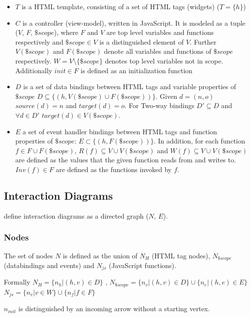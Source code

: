 \begin{itemize}
  \item $T$ is a HTML template, consisting of a set of HTML tags (widgets) ($T = \{h\}$)
  \item 
  $C$ is a controller (view-model), written in JavaScript. It is modeled as a tuple ($V$, $F$, $\$scope$), where $F$ and $V$ are top level variables and functions respectively and $\$scope \in V$ is a distinguished element of $V$. Further $V(\$scope)$ and $F(\$scope)$ denote all variables and functions of $\$scope$ respectively. $W = V \setminus \{\$scope\}$ denotes top level variables not in scope. Additionally $init \in F$ is defined as an initialization function
  \item $D$ is a set of data bindings between HTML tags and variable properties of $\$scope$ $ D \subseteq \{(h,V(\$scope) \cup F(\$scope))\}$. Given $d = (n,o)$ $source(d) = n$ and $target(d) = o$. For Two-way bindings $D' \subseteq D$ and $\forall d \in D'$ $target(d) \in V(\$scope)$.
  \item $E$ a set of event handler bindings between HTML tags and function properties of $\$scope$: $E \subset \{(h,F(\$scope))\}$. In addition, for each function $f \in F \cup F(\$scope)$, $R(f) \subseteq V \cup V(\$scope)$ and $W(f) \subseteq V \cup V(\$scope)$ are defined as the values that the given function reads from and writes to. $Inv(f) \in F $ are defined as the functions invoked by $f$. \parencite{zhang2019scenario}
\end{itemize}
\subsection{Interaction Diagrams}
\label{intro:zhang_interaction_diagrams}
\textcite{zhang2019scenario} define interaction diagrams as a directed graph ($N$, $E$). 

\subsubsection{Nodes}
The set of nodes $N$ is defined as the union of $N_H$ (HTML tag nodes), $N_{\$scope}$ (databindings and events) and  $N_{js}$ (JavaScript functions). 

Formally $N_H = \{n_h | (h,v) \in D\}$ , $N_{\$scope} = \{n_v | (h,v) \in D\} \cup \{n_e | (h,e) \in E\}$ 
$N_{js} = \{n_v | v \in W\} \cup \{n_f | f \in F\} $

$n_{init}$ is distinguished by an incoming arrow without a starting vertex.

